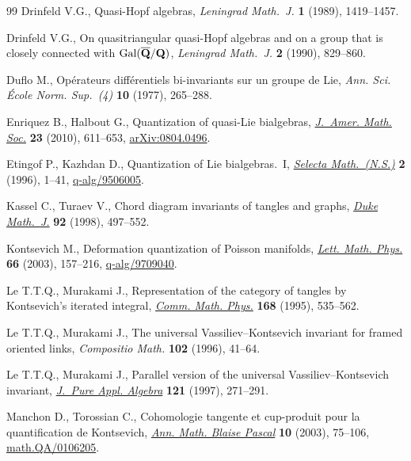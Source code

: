\documentclass[10pt,a4paper]{amsart}
\numberwithin{equation}{section}
\theoremstyle{definition}
\begin{document}
\begin{thebibliography}{99}
Drinfeld V.G., Quasi-{H}opf algebras, \textit{Leningrad Math.~J.} \textbf{1}
 (1989), 1419--1457.

Drinfeld V.G., On quasitriangular quasi-{H}opf algebras and on a group that is
 closely connected with {${\rm Gal}(\overline{\bf Q}/{\bf Q})$},
 \textit{Leningrad Math.~J.} \textbf{2} (1990), 829--860.

Duf\/lo M., Op\'erateurs dif\/f\'erentiels bi-invariants sur un groupe de {L}ie,
 \textit{Ann. Sci. \'Ecole Norm. Sup.~(4)} \textbf{10} (1977), 265--288.

Enriquez B., Halbout G., Quantization of quasi-{L}ie bialgebras,
 \href{http://dx.doi.org/10.1090/S0894-0347-10-00654-5}{\textit{J.~Amer. Math. Soc.}} \textbf{23} (2010), 611--653,
 \href{http://arxiv.org/abs/0804.0496}{arXiv:0804.0496}.

Etingof P., Kazhdan D., Quantization of {L}ie bialgebras.~{I}, \href{http://dx.doi.org/10.1007/BF01587938}{\textit{Selecta
 Math.~(N.S.)}} \textbf{2} (1996), 1--41, \mbox{\href{http://arxiv.org/abs/q-alg/9506005}{q-alg/9506005}}.

Kassel C., Turaev V., Chord diagram invariants of tangles and graphs,
 \href{http://dx.doi.org/10.1215/S0012-7094-98-09215-8}{\textit{Duke Math.~J.}} \textbf{92} (1998), 497--552.

Kontsevich M., Deformation quantization of {P}oisson manifolds, \href{http://dx.doi.org/10.1023/B:MATH.0000027508.00421.bf}{\textit{Lett.
 Math. Phys.}} \textbf{66} (2003), 157--216, \mbox{\href{http://arxiv.org/abs/q-alg/9709040}{q-alg/9709040}}.

Le T.T.Q., Murakami J., Representation of the category of tangles by
 {K}ontsevich's iterated integral, \href{http://dx.doi.org/10.1007/BF02101842}{\textit{Comm. Math. Phys.}} \textbf{168}
 (1995), 535--562.

Le T.T.Q., Murakami J., The universal {V}assiliev--{K}ontsevich invariant for
 framed oriented links, \textit{Compositio Math.} \textbf{102} (1996), 41--64.

Le T.T.Q., Murakami J., Parallel version of the universal
 {V}assiliev--{K}ontsevich invariant, \href{http://dx.doi.org/10.1016/S0022-4049(96)00054-0}{\textit{J.~Pure Appl. Algebra}}
 \textbf{121} (1997), 271--291.

Manchon D., Torossian C., Cohomologie tangente et cup-produit pour la
 quantif\/ication de {K}ontsevich, \href{http://dx.doi.org/10.5802/ambp.168}{\textit{Ann. Math. Blaise Pascal}} \textbf{10}
 (2003), 75--106, \href{http://arxiv.org/abs/math.QA/0106205}{math.QA/0106205}.


\end{thebibliography}
\end{document}
